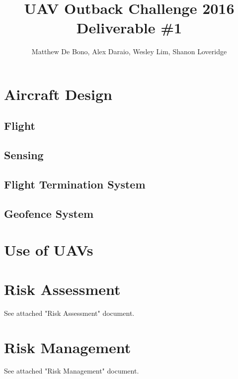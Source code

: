\documentclass[]{article}
\title{UAV Outback Challenge 2016\\ \large Deliverable \#1\\}
\author{
	Matthew De Bono,
	Alex Daraio,
	Wesley Lim,
	Shanon Loveridge}
\begin{document}
\maketitle

\section{Aircraft Design}
\subsection{Flight}


\subsection{Sensing}


\subsection{Flight Termination System}


\subsection{Geofence System}


\section{Use of UAVs}


\section{Risk Assessment}
See attached "Risk Assessment" document.

\section{Risk Management}
See attached "Risk Management" document.
\end{document}
